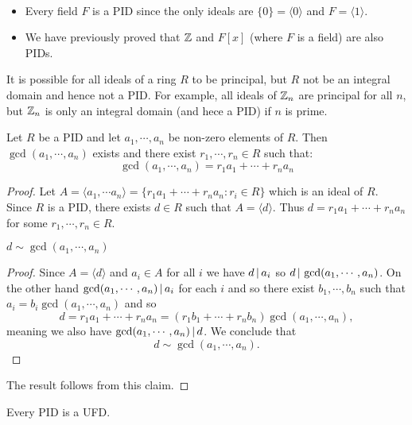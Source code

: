 \documentclass[11pt]{article}
\begin{document}
\begin{example}\,
    \begin{itemize}
        \item Every field $F$ is a PID since the only ideals are $\{0\}=\langle 0\rangle$ and $F=\langle 1\rangle$.
        \item We have previously proved that $\mathbb{Z}$ and $F[x]$ (where $F$ is a field) are also PIDs.
    \end{itemize}
\end{example}

\begin{remark}
    It is possible for all ideals of a ring $R$ to be principal, but $R$ not be an integral domain and hence not a PID. For example, all ideals of $\mathbb{Z}_n$ are principal for all $n$, but $\mathbb{Z}_n$ is only an integral domain (and hece a PID) if $n$ is prime.
\end{remark}

\begin{proposition}
    Let $R$ be a PID and let $a_1,\cdots,a_n$ be non-zero elements of $R$. Then $\gcd(a_1,\cdots,a_n)$ exists and there exist $r_1,\cdots,r_n\in R$ such that:
    \[\gcd(a_1,\cdots,a_n)=r_1a_1+\cdots+r_na_n\]
\end{proposition}

\begin{proof}
    Let $A=\langle a_1,\cdots a_n\rangle=\{r_1a_1+\cdots+r_na_n:r_i\in R\}$ which is an ideal of $R$. Since $R$ is a PID, there exists $d\in R$ such that $A=\langle d\rangle$. Thus $d=r_1a_1+\cdots+r_na_n$ for some $r_1,\cdots,r_n\in R$.
    \begin{claim}
        $d\sim\gcd(a_1,\cdots,a_n)$
    \end{claim}
    \begin{proof}
        Since $A=\langle d\rangle$ and $a_i\in A$ for all $i$ we have $d\,|\, a_i$ so $d\,|\, \gcd(a_1,\cdots,a_n)$. On the other hand $\gcd(a_1,\cdots,a_n)\,|\, a_i$ for each $i$ and so there exist $b_1,\cdots,b_n$ such that $a_i=b_i\gcd(a_1,\cdots,a_n)$ and so
        \[d=r_1a_1+\cdots+r_na_n=(r_1b_1+\cdots+r_nb_n)\gcd(a_1,\cdots,a_n),\]
        meaning we also have $\gcd(a_1,\cdots,a_n)\,|\, d$. We conclude that
        \[d\sim\gcd(a_1,\cdots,a_n).\]
    \end{proof}
    The result follows from this claim.
    
\end{proof}

\begin{theorem}
    Every PID is a UFD.
\end{theorem}
\end{document}
